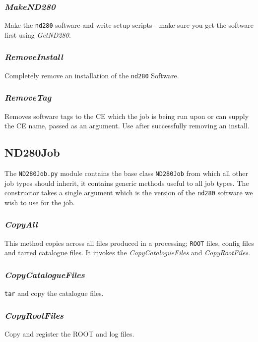 \documentclass[11pt]{article}
\begin{document}
\subsubsection*{\textit{MakeND280}}
Make the \verb+nd280+ software and write setup scripts - make sure you get
the software first using \textit{GetND280}.

\subsubsection*{\textit{RemoveInstall}}
Completely remove an installation of the \verb+nd280+ Software.

\subsubsection*{\textit{RemoveTag}}
Removes software tags to the CE which the job is being run upon or can
supply the CE name, passed as an argument. Use after successfully
removing an install. 

\subsection{ND280Job}

The \verb+ND280Job.py+ module contains the base class \verb+ND280Job+
from which all other job types should inherit, it contains generic
methods useful to all job types. The constructor takes a single
argument which is the version of the \verb+nd280+ software we wish to use for
the job.

\subsubsection*{\textit{CopyAll}}
This method copies across all files produced in a processing; \verb+ROOT+
files, config files and tarred catalogue files. It invokes the
\textit{CopyCatalogueFiles} and \textit{CopyRootFiles}.

\subsubsection*{\textit{CopyCatalogueFiles}}
\verb+tar+ and copy the catalogue files.

\subsubsection*{\textit{CopyRootFiles}}
Copy and register the ROOT and log files.
\end{document}

